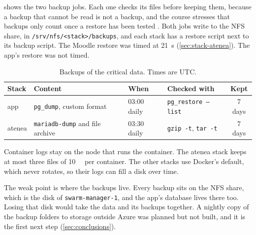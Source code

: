  shows the two backup jobs. Each one checks its files
before keeping them, because a backup that cannot be read is not a
backup, and the course stresses that backups only count once a restore
has been tested \parencite{llusa2026hadr}. Both jobs write to the NFS
share, in \texttt{/srv/nfs/<stack>/backups}, and each stack has a restore
script next to its backup script. The Moodle restore was timed at
\qty{21}{\second} (\cref{sec:stack-atenea}). The app's restore was not
timed.

\begin{table}[htbp]
  \centering
  \caption{Backups of the critical data. Times are UTC.}
  \label{tab:backups}
  \small
  \begin{tabular}{llllc}
    \toprule
    Stack  & Content                                  & When          & Checked with                          & Kept \\
    \midrule
    app    & \texttt{pg\_dump}, custom format         & 03:00 daily   & \texttt{pg\_restore --list}           & 7 days \\
    atenea & \texttt{mariadb-dump} and file archive   & 03:30 daily   & \texttt{gzip -t}, \texttt{tar -t}     & 7 days \\
    \bottomrule
  \end{tabular}
\end{table}

Container logs stay on the node that runs the container. The atenea
stack keeps at most three files of \qty{10}{\mega\byte} per container.
The other stacks use Docker's default, which never rotates, so their logs
can fill a disk over time.

The weak point is where the backups live. Every backup sits on the NFS
share, which is the disk of \texttt{swarm-manager-1}, and the app's
database lives there too. Losing that disk would take the data and its
backups together. A nightly copy of the backup folders to storage outside
Azure was planned but not built, and it is the first next step
(\cref{sec:conclusions}).

